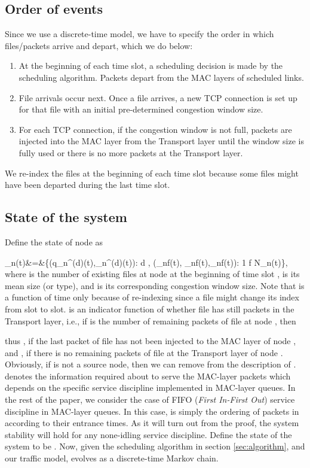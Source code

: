 \documentclass[10pt,onecolumn,draftclsnofoot,journal]{IEEEtran}
\newcommand{\mD} {\mathcal{D}}
\newcommand{\mS}{\mathcal{S}}
\newcommand{\ben}{}
\begin{document}
\subsection*{Order of events}
Since we use a discrete-time model, we have to specify the order in which files/packets arrive and depart, which we do below:
\begin{enumerate}

\item At the beginning of each time slot, a scheduling decision is made by the scheduling algorithm. Packets depart from the MAC layers of scheduled links.

\item File arrivals occur next. Once a file arrives, a new TCP connection is set up for that file with an initial pre-determined congestion window size.

\item For each TCP connection, if the congestion window is not full, packets are injected into the MAC layer from the Transport layer until the window size is fully used or there is no more packets at the Transport layer.
\end{enumerate}
We re-index the files at the beginning of each time slot because some files might have been departed during the last time
slot.
\subsection*{State of the system}
Define the state of node  as
\ben
\mS_n(t)&=&\bigl\{(q_n^{(d)}(t),_n^{(d)}(t)): d \in \mD, (\xi_{nf}(t), _{nf}(t),\sigma_{nf}(t)): 1 \leq f \leq N_n(t)\bigr\},
\een
where  is the number of existing files at node  at the beginning of time slot ,  is its mean size (or type), and  is its corresponding congestion window size. Note that  is a function of time only because of re-indexing
since a file might change its index from slot to slot.  is an indicator function of whether file  has still packets in the Transport layer, i.e., if  is the number of remaining packets of file  at node , then

 thus , if the last packet of file  has not been injected to the MAC layer of node , and , if there is no remaining packets of file  at the Transport layer of node . Obviously, if  is not a source node, then we can remove  from the description of .  denotes the information required about  to serve the MAC-layer packets which depends on the specific service discipline implemented in MAC-layer queues. In the rest of the paper, we consider the case of FIFO (\textit{First In-First Out}) service discipline in MAC-layer queues. In this case,  is simply the ordering of packets in  according to their entrance times. As it will turn out from the proof, the system stability will hold for any none-idling service discipline.
Define the state of the system to be . Now, given the scheduling algorithm in section \ref{sec:algorithm}, and our traffic model,  evolves as a discrete-time Markov chain.
\end{document}
